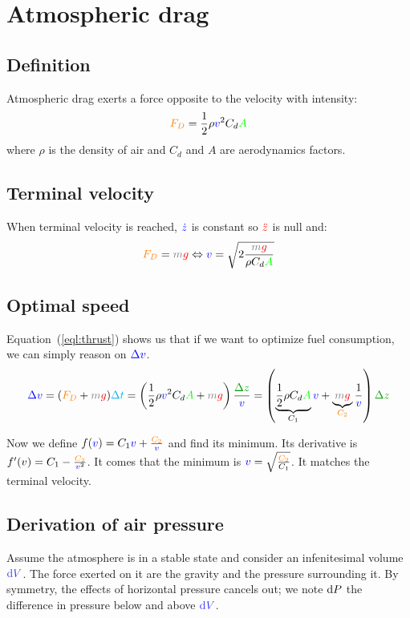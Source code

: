 \section{Atmospheric drag}

\subsection{Definition}

Atmospheric drag exerts a force opposite to the velocity with intensity:
\[
\textcolor{orange}{F_D}
= \frac 1 2 \rho \textcolor{blue}{v}^2 C_d \textcolor{green}{A}
\]
where $\rho$ is the density of air and $C_d$ and $A$ are aerodynamics
factors.

\subsection{Terminal velocity}

When terminal velocity is reached, $\textcolor{blue}{\dot z}$ is constant so
$\textcolor{red}{\ddot z}$ is null and:
\[
\force{F_D} = \mass{m} \accel{g}
\Leftrightarrow
\speed{v} = \sqrt{2\frac {\mass{m} \accel{g}} {\rho C_d \area{A}}}
\]

\subsection{Optimal speed}

Equation~(\ref{eql:thrust}) shows us that if we want to optimize fuel consumption, we can simply reason on $\textcolor{blue}{\Delta v}$.
\[
\speed{\Delta v}
= (\force{F_D} + \mass{m} \accel{g}) \delay{\Delta t}
= \left(\frac 1 2 \rho \speed{v}^2 C_d \area{A} + \mass{m} \accel{g}\right) \frac {\dist{\Delta z}} {\speed{v}}
= \left(
	\underbrace{\frac 1 2 \rho C_d \area{A}}_{C_1} \speed{v} +
	\underbrace{\mass{m} \accel{g}}_{\force{C_2}} \frac 1 {\speed{v}}
\right) \dist{\Delta z}
\]

Now we define $f(\textcolor{blue}{v}) = C_1 \textcolor{blue}{v} + \frac {\textcolor{orange}{C_2}}
{\textcolor{blue}{v}}$ and find its minimum. Its derivative is $f'(v) = C_1 - \frac
{\textcolor{orange}{C_2}} {\textcolor{blue}{v}^2}$. It comes that the minimum is $\textcolor{blue}{v}
= \sqrt{\frac {\textcolor{orange}{C_2}} {C_1}}$.  It matches the terminal velocity.

\subsection{Derivation of air pressure}

Assume the atmosphere is in a stable state and consider an infenitesimal
volume $\vol{\d V}$. The force exerted on it are the gravity and the
pressure surrounding it. By symmetry, the effects of horizontal pressure
cancels out; we note $\mathrm{d} P$ the difference in pressure below and above
$\vol{\d V}$.

